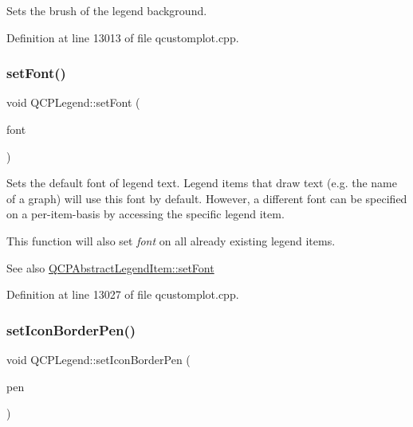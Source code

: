 Sets the brush of the legend background. 

Definition at line 13013 of file qcustomplot.\+cpp.

\mbox{\label{class_q_c_p_legend_aa4cda8499e3cb0f3be415edc02984c73}} 
\subsubsection{\texorpdfstring{set\+Font()}{setFont()}}
{\footnotesize\ttfamily void Q\+C\+P\+Legend\+::set\+Font (\begin{DoxyParamCaption}\item[{const Q\+Font \&}]{font }\end{DoxyParamCaption})}

Sets the default font of legend text. Legend items that draw text (e.\+g. the name of a graph) will use this font by default. However, a different font can be specified on a per-\/item-\/basis by accessing the specific legend item.

This function will also set {\itshape font} on all already existing legend items.

\begin{DoxySeeAlso}{See also}
\hyperlink{class_q_c_p_abstract_legend_item_a409c53455d8112f71d70c0c43eb10265}{Q\+C\+P\+Abstract\+Legend\+Item\+::set\+Font} 
\end{DoxySeeAlso}


Definition at line 13027 of file qcustomplot.\+cpp.

\mbox{\label{class_q_c_p_legend_a2f2c93d18a651f4ff294bb3f026f49b8}} 
\subsubsection{\texorpdfstring{set\+Icon\+Border\+Pen()}{setIconBorderPen()}}
{\footnotesize\ttfamily void Q\+C\+P\+Legend\+::set\+Icon\+Border\+Pen (\begin{DoxyParamCaption}\item[{const Q\+Pen \&}]{pen }\end{DoxyParamCaption})}

